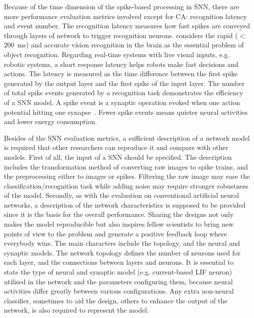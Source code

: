 \documentclass{frontiersENG} %
\begin{document}
Because of the time dimension of the spike-based processing in SNN, there are more performance evaluation metrics involved except for CA: recognition latency and event number.
The recognition latency measures how fast spikes are conveyed through layers of network to trigger recognition neurons.
\cite{dicarlo2012does} considers the rapid ($<$200~ms) and accurate vision recognition in the brain as the essential problem of object recognition.
Regarding real-time systems with live visual inputs, e.g. robotic systems, a short response latency helps robots make fast decisions and actions.
The latency is measured as the time difference between the first spike generated by the output layer and the first spike of the input layer.
The number of total spike events generated by a recognition task demonstrates the efficiency of a SNN model.
A spike event is a synaptic operation evoked when one action potential hitting one synapse~\citep{sharp2012power}.
Fewer spike events means quieter neural activities and lower energy consumption.

Besides of the SNN evaluation metrics, a sufficient description of a network model is required that other researchers can reproduce it and compare with other models.
First of all, the input of a SNN should be specified.
The description includes the transformation method of converting raw images to spike trains, and the preprocessing either to images or spikes.
Filtering the raw image may ease the classification/recognition task while adding noise may require stronger robustness of the model.
Secondly, as with the evaluation on conventional artificial neural networks, a description of the network characteristics is supposed to be provided since it is the basis for the overall performance.
Sharing the designs not only makes the model reproducible but also inspires fellow scientists to bring new points of view to the problem and generate a positive feedback loop where everybody wins.
The main characters include the topology, and the neural and synaptic models.
The network topology defines the number of neurons used for each layer, and the connections between layers and neurons.
It is essential to state the type of neural and synaptic model (e.g. current-based LIF neuron) utilised in the network and the parameters configuring them, because neural activities differ greatly between various configurations.
Any extra non-neural classifier, sometimes to aid the design, others to enhance the output of the network, is also required to represent the model.
\end{document}
